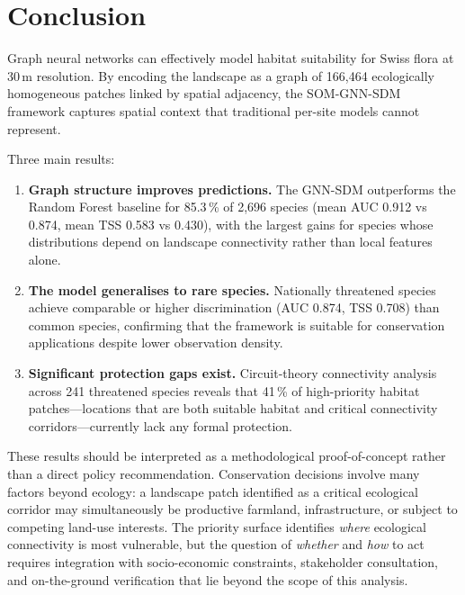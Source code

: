 \section{Conclusion}
\label{sec:conclusion}

Graph neural networks can effectively model habitat suitability for Swiss 
flora at 30\,m resolution. By encoding the landscape as a graph of
166,464 ecologically homogeneous patches linked by spatial
adjacency, the SOM-GNN-SDM framework captures spatial context
that traditional per-site models cannot represent.

Three main results:

\begin{enumerate}
  \item \textbf{Graph structure improves predictions.} The
    GNN-SDM outperforms the Random Forest baseline for
    85.3\,\% of 2,696 species (mean AUC 0.912 vs 0.874,
    mean TSS 0.583 vs 0.430), with the largest gains for
    species whose distributions depend on landscape
    connectivity rather than local features alone.

  \item \textbf{The model generalises to rare species.}
    Nationally threatened species achieve comparable or
    higher discrimination (AUC 0.874, TSS 0.708) than
    common species, confirming that the framework is
    suitable for conservation applications despite lower
    observation density.

  \item \textbf{Significant protection gaps exist.}
    Circuit-theory connectivity analysis across 241
    threatened species reveals that 41\,\% of
    high-priority habitat patches---locations that are both
    suitable habitat and critical connectivity
    corridors---currently lack any formal protection.
\end{enumerate}

These results should be interpreted as a methodological
proof-of-concept rather than a direct policy recommendation.
Conservation decisions involve many factors beyond ecology:
a landscape patch identified as a critical ecological corridor
may simultaneously be productive farmland, infrastructure, or
subject to competing land-use interests. The priority surface
identifies \emph{where} ecological connectivity is most
vulnerable, but the question of \emph{whether} and \emph{how}
to act requires integration with socio-economic constraints,
stakeholder consultation, and on-the-ground verification that
lie beyond the scope of this analysis.

